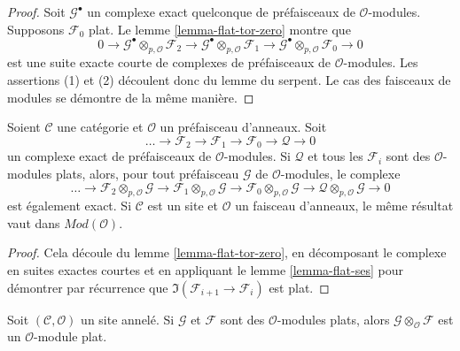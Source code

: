 \begin{proof}
Soit $\mathcal{G}^\bullet$ un complexe exact quelconque de préfaisceaux de
$\mathcal{O}$-modules. Supposons $\mathcal{F}_0$ plat. Le lemme
\ref{lemma-flat-tor-zero} montre que
$$
0 \to
\mathcal{G}^\bullet \otimes_{p, \mathcal{O}} \mathcal{F}_2 \to
\mathcal{G}^\bullet \otimes_{p, \mathcal{O}} \mathcal{F}_1 \to
\mathcal{G}^\bullet \otimes_{p, \mathcal{O}} \mathcal{F}_0 \to 0
$$
est une suite exacte courte de complexes de préfaisceaux de
$\mathcal{O}$-modules. Les assertions (1) et (2) découlent donc du lemme du
serpent. Le cas des faisceaux de modules se démontre de la même manière.
\end{proof}

\begin{lemma}

\label{lemma-flat-resolution-of-flat}
Soient $\mathcal{C}$ une catégorie et $\mathcal{O}$ un préfaisceau d'anneaux.
Soit
$$
\ldots \to
\mathcal{F}_2 \to
\mathcal{F}_1 \to
\mathcal{F}_0 \to
\mathcal{Q} \to 0
$$
un complexe exact de préfaisceaux de $\mathcal{O}$-modules. Si
$\mathcal{Q}$ et tous les $\mathcal{F}_i$ sont des $\mathcal{O}$-modules
plats, alors, pour tout préfaisceau $\mathcal{G}$ de $\mathcal{O}$-modules,
le complexe
$$
\ldots \to
\mathcal{F}_2 \otimes_{p, \mathcal{O}} \mathcal{G} \to
\mathcal{F}_1 \otimes_{p, \mathcal{O}} \mathcal{G} \to
\mathcal{F}_0 \otimes_{p, \mathcal{O}} \mathcal{G} \to
\mathcal{Q} \otimes_{p, \mathcal{O}} \mathcal{G} \to 0
$$
est également exact. Si $\mathcal{C}$ est un site et $\mathcal{O}$ un
faisceau d'anneaux, le même résultat vaut dans
$\textit{Mod}(\mathcal{O})$.
\end{lemma}

\begin{proof}

Cela découle du lemme \ref{lemma-flat-tor-zero}, en décomposant le complexe
en suites exactes courtes et en appliquant le lemme \ref{lemma-flat-ses}
pour démontrer par récurrence que
$\Im(\mathcal{F}_{i + 1} \to \mathcal{F}_i)$ est plat.

\end{proof}

\begin{lemma}

\label{lemma-tensor-flats}
Soit $(\mathcal{C}, \mathcal{O})$ un site annelé. Si $\mathcal{G}$ et
$\mathcal{F}$ sont des $\mathcal{O}$-modules plats, alors
$\mathcal{G} \otimes_\mathcal{O} \mathcal{F}$ est un
$\mathcal{O}$-module plat.
\end{lemma}

